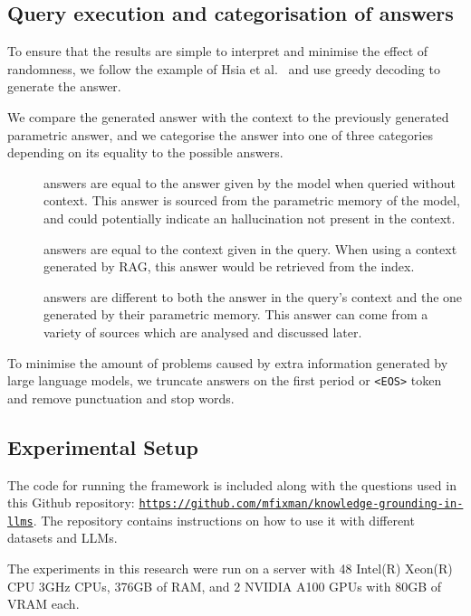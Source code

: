 \subsection{Query execution and categorisation of answers}

To ensure that the results are simple to interpret and minimise the effect of randomness, we follow the example of Hsia et al.~\cite{ragged} and use greedy decoding to generate the answer.

We compare the generated answer with the context to the previously generated parametric answer, and we categorise the answer into one of three categories depending on its equality to the possible answers.

\begin{description}
	\item[\Parametric{}] answers are equal to the answer given by the model when queried without context.
		This answer is sourced from the parametric memory of the model, and could potentially indicate an hallucination not present in the context.
	\item[\Contextual{}] answers are equal to the context given in the query.
		When using a context generated by RAG, this answer would be retrieved from the index.
	\item[\Other] answers are different to both the answer in the query's context and the one generated by their parametric memory.
		This answer can come from a variety of sources which are analysed and discussed later.
\end{description}

To minimise the amount of problems caused by extra information generated by large language models, we truncate answers on the first period or \texttt{<EOS>} token and remove punctuation and stop words.


\subsection{Experimental Setup}

The code for running the framework is included along with the questions used in this Github repository: \texttt{\url{https://github.com/mfixman/knowledge-grounding-in-llms}}.
The repository contains instructions on how to use it with different datasets and LLMs.

The experiments in this research were run on a server with 48 Intel(R) Xeon(R) CPU 3GHz CPUs, 376GB of RAM, and 2 NVIDIA A100 GPUs with 80GB of VRAM each. 
